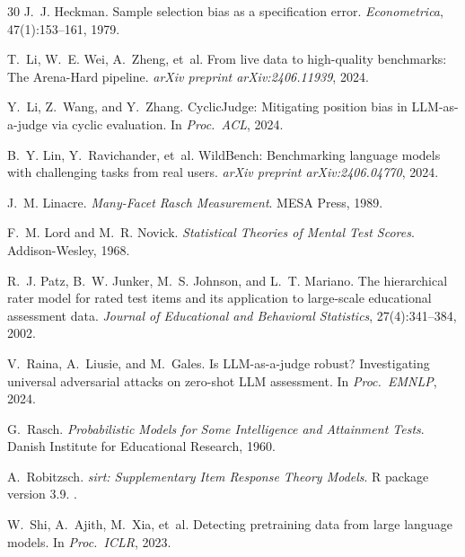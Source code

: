 \documentclass[11pt]{article}
\begin{document}
\begin{thebibliography}{30}
J.~J. Heckman.
\newblock Sample selection bias as a specification error.
\newblock \emph{Econometrica}, 47(1):153--161, 1979.

T.~Li, W.~E. Wei, A.~Zheng, et~al.
\newblock From live data to high-quality benchmarks: The Arena-Hard pipeline.
\newblock \emph{arXiv preprint arXiv:2406.11939}, 2024{}.

Y.~Li, Z.~Wang, and Y.~Zhang.
\newblock CyclicJudge: Mitigating position bias in LLM-as-a-judge via cyclic evaluation.
\newblock In \emph{Proc.\ ACL}, 2024{}.

B.~Y. Lin, Y.~Ravichander, et~al.
\newblock WildBench: Benchmarking language models with challenging tasks from real users.
\newblock \emph{arXiv preprint arXiv:2406.04770}, 2024.

J.~M. Linacre.
\newblock \emph{Many-Facet Rasch Measurement}.
\newblock MESA Press, 1989.

F.~M. Lord and M.~R. Novick.
\newblock \emph{Statistical Theories of Mental Test Scores}.
\newblock Addison-Wesley, 1968.

R.~J. Patz, B.~W. Junker, M.~S. Johnson, and L.~T. Mariano.
\newblock The hierarchical rater model for rated test items and its application to large-scale educational assessment data.
\newblock \emph{Journal of Educational and Behavioral Statistics}, 27(4):341--384, 2002.

V.~Raina, A.~Liusie, and M.~Gales.
\newblock Is LLM-as-a-judge robust? Investigating universal adversarial attacks on zero-shot LLM assessment.
\newblock In \emph{Proc.\ EMNLP}, 2024.

G.~Rasch.
\newblock \emph{Probabilistic Models for Some Intelligence and Attainment Tests}.
\newblock Danish Institute for Educational Research, 1960.

A.~Robitzsch.
\newblock \emph{sirt: Supplementary Item Response Theory Models}. R package version 3.9.
.

W.~Shi, A.~Ajith, M.~Xia, et~al.
\newblock Detecting pretraining data from large language models.
\newblock In \emph{Proc.\ ICLR}, 2023.


\end{thebibliography}
\end{document}
